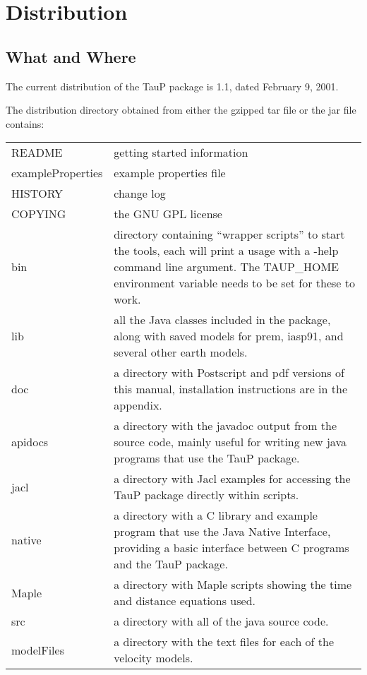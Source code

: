 
\section{Distribution}


\subsection{What and Where}
The current distribution of the TauP package is 1.1, dated February 9, 2001.

The distribution directory obtained from either the gzipped tar file or the jar file contains:

\begin{center}
\begin{tabular}{lp{4in}}
README & getting started information \\
exampleProperties & example properties file \\
HISTORY & change log \\
COPYING & the GNU GPL license \\
bin & directory containing ``wrapper scripts'' to start the tools,
   each will print a usage with a -help command line argument.
   The TAUP\_HOME environment variable needs to be set for these to work.\\
lib & all the Java classes included in the package, along with
               saved models for prem, iasp91, and several other earth models. \\
doc & a directory with Postscript and pdf versions of this manual,
installation instructions are in the appendix. \\
apidocs & a directory with the javadoc output from
the source code, mainly useful
for writing new java programs that use the TauP package. \\
jacl & a directory with Jacl examples for accessing the TauP package directly within scripts. \\
native & a directory with a C library and example program that use the
Java Native Interface, providing a basic interface between C programs
and the TauP package. \\
Maple & a directory with Maple scripts showing the time and distance equations
used. \\
src & a directory with all of the java source code. \\
modelFiles & a directory with the text files for each of the velocity models.
\end{tabular}
\end{center}


